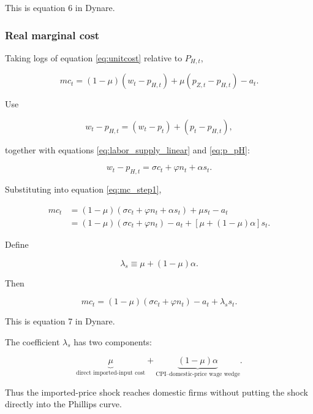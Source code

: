 This is equation 6 in Dynare.

\subsubsection{Real marginal cost}

Taking logs of equation \eqref{eq:unitcost} relative to \(P_{H,t}\),

\begin{equation}
mc_t
=
(1-\mu)(w_t-p_{H,t})
+
\mu(p_{Z,t}-p_{H,t})
-a_t.
\label{eq:mc_step1}
\end{equation}

Use

\[
w_t-p_{H,t}
=
(w_t-p_t)+(p_t-p_{H,t}),
\]

together with equations \eqref{eq:labor_supply_linear} and \eqref{eq:p_pH}:

\begin{equation}
w_t-p_{H,t}
=
\sigma c_t+\varphi n_t+\alpha s_t.
\end{equation}

Substituting into equation \eqref{eq:mc_step1},

\begin{align}
mc_t
&=
(1-\mu)
\left(
\sigma c_t+\varphi n_t+\alpha s_t
\right)
+
\mu s_t-a_t
\\
&=
(1-\mu)
\left(
\sigma c_t+\varphi n_t
\right)
-a_t
+
\left[
\mu+(1-\mu)\alpha
\right]s_t.
\end{align}

Define

\begin{equation}
\boxed{
\lambda_s
\equiv
\mu+(1-\mu)\alpha.
}
\label{eq:lambda_s}
\end{equation}

Then

\begin{equation}
\boxed{
mc_t
=
(1-\mu)
\left(
\sigma c_t+\varphi n_t
\right)
-a_t
+
\lambda_ss_t.
}
\label{eq:mc_final}
\end{equation}

This is equation 7 in Dynare.

The coefficient \(\lambda_s\) has two components:

\[
\underbrace{\mu}_{\text{direct imported-input cost}}
+
\underbrace{(1-\mu)\alpha}_{\text{CPI--domestic-price wage wedge}}.
\]

Thus the imported-price shock reaches domestic firms without putting the shock
directly into the Phillips curve.

